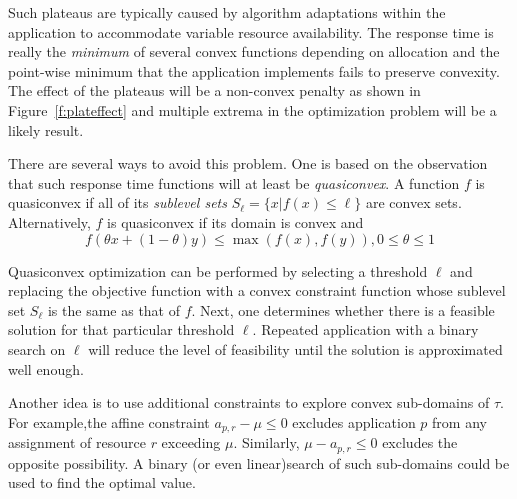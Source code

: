 Such plateaus are typically caused by algorithm adaptations within the application to accommodate variable resource availability.  The response time is really the \emph{minimum} of several convex functions depending on allocation and the point-wise minimum that the application implements fails to preserve convexity.  The effect of the plateaus will be a non-convex penalty as shown in Figure~\ref{f:plateffect} and multiple extrema in the optimization problem will be a likely result.

There are several ways to avoid this problem.  One is based on the observation that such response time functions
will at least be \emph{quasiconvex}.  A function $f$ is quasiconvex if all of its \emph{sublevel sets}
$S_\ell = \{x | f(x) \leq \ell\}$ are convex sets.
Alternatively, $f$ is quasiconvex if its domain is convex and
\begin{displaymath}
f(\theta x + (1-\theta)y) \leq \max(f(x),f(y)), 0 \leq \theta \leq 1
\end{displaymath}

Quasiconvex optimization can be performed by selecting a threshold $\ell$ and replacing the objective function
with a convex constraint function whose sublevel set $S_\ell$ is the same as that of $f$.
Next, one determines whether there is a feasible solution for that particular threshold $\ell$.
Repeated application with a binary search on $\ell$ will reduce the level of feasibility
until the solution is approximated well enough.

Another idea is to use additional constraints to explore convex sub-domains of $\tau$.
For example,the affine constraint $a_{p,r} - \mu \leq 0$ excludes application $p$ from any assignment of resource $r$ exceeding $\mu$.  Similarly, $\mu - a_{p,r} \leq 0$ excludes the opposite possibility.
A binary (or even linear)search of such sub-domains could be used to find the optimal value.




